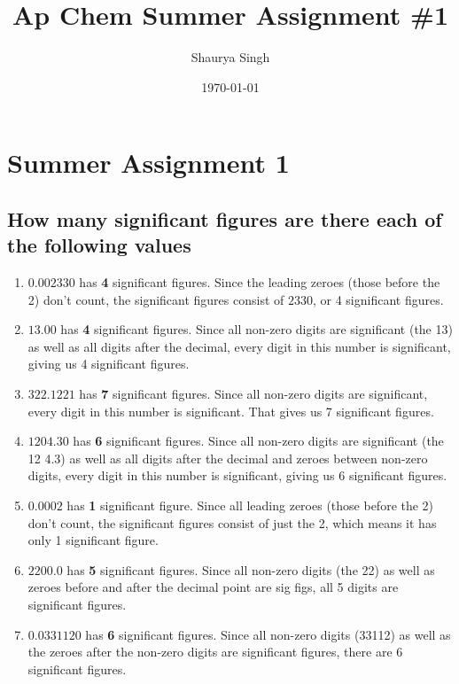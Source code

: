 \documentclass[11pt]{article}
\author{Shaurya Singh}
\date{\today}
\title{Ap Chem Summer Assignment \#1}
\begin{document}
\maketitle

\section{Summer Assignment 1}
\label{sec:orgca3dbeb}
\subsection{How many significant figures are there each of the following values}
\label{sec:org354d6b2}
\begin{enumerate}
\item \(0.002330\) has \textbf{4} significant figures. Since the leading zeroes (those before the 2) don't count, the significant figures consist of \(2330\), or 4 significant figures.
\item \(13.00\) has \textbf{4} significant figures. Since all non-zero digits are significant (the 13) as well as all digits after the decimal, every digit in this number is significant, giving us 4 significant figures.
\item \(322.1221\) has \textbf{7} significant figures. Since all non-zero digits are significant, every digit in this number is significant. That gives us 7 significant figures.
\item \(1204.30\) has \textbf{6} significant figures. Since all non-zero digits are significant (the 12 4.3) as well as all digits after the decimal and zeroes between non-zero digits, every digit in this number is significant, giving us 6 significant figures.
\item \(0.0002\) has \textbf{1} significant figure. Since all leading zeroes (those before the 2) don't count, the significant figures consist of just the 2, which means it has only 1 significant figure.
\item \(2200.0\) has \textbf{5} significant figures. Since all non-zero digits (the 22) as well as zeroes before and after the decimal point are sig figs, all 5 digits are significant figures.
\item \(0.0331120\) has \textbf{6} significant figures. Since all non-zero digits (33112) as well as the zeroes after the non-zero digits are significant figures, there are 6 significant figures.
\end{enumerate}
\end{document}

